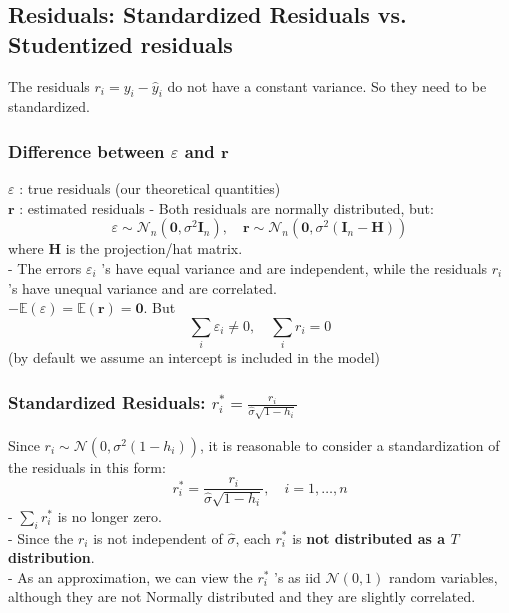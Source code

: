 \documentclass[11pt,a4paper]{article}
\begin{document}
\subsection{Residuals: Standardized Residuals vs. Studentized residuals}
The residuals $r_i=y_i-\hat{y}_i$ do not have a constant variance. So they need to be standardized.
\subsubsection{Diﬀerence between $\varepsilon$ and $\mathbf{r}$}
$\varepsilon$ : true residuals (our theoretical quantities)\\
$\mathbf{r}$ : estimated residuals
- Both residuals are normally distributed, but:
$$
\varepsilon \sim \mathcal{N}_{n}\left(\mathbf{0}, \sigma^{2} \mathbf{I}_{n}\right), \quad \mathbf{r} \sim \mathcal{N}_{n}\left(\mathbf{0}, \sigma^{2}\left(\mathbf{I}_{n}-\mathbf{H}\right)\right)
$$
where $\mathbf{H}$ is the projection/hat matrix.\\
- The errors $\varepsilon_{i}$ 's have equal variance and are independent, while the residuals $r_{i}$ 's have unequal variance and are correlated.\\
$-\mathbb{E}(\varepsilon)=\mathbb{E}(\mathbf{r})=\mathbf{0} .$ But
$$
\sum_{i} \varepsilon_{i} \neq 0, \quad \sum_{i} r_{i}=0
$$
(by default we assume an intercept is included in the model)
\subsubsection{Standardized Residuals: $
r_{i}^{*}=\frac{r_{i}}{\hat{\sigma} \sqrt{1-h_{i}}}$}
Since $r_{i} \sim \mathcal{N}\left(0, \sigma^{2}\left(1-h_{i}\right)\right)$, it is reasonable to consider a standardization of the residuals in this form:
$$
r_{i}^{*}=\frac{r_{i}}{\hat{\sigma} \sqrt{1-h_{i}}}, \quad i=1, \ldots, n
$$
- $\sum_{i} r_{i}^{*}$ is no longer zero.\\
- Since the $r_{i}$ is not independent of $\hat{\sigma}$, each $r_{i}^{*}$ is \textbf{not distributed as a $T$ distribution}.\\
- As an approximation, we can view the $r_{i}^{*}$ 's as iid $\mathcal{N}(0,1)$ random variables, although they are not Normally distributed and they are slightly correlated.
\end{document}
